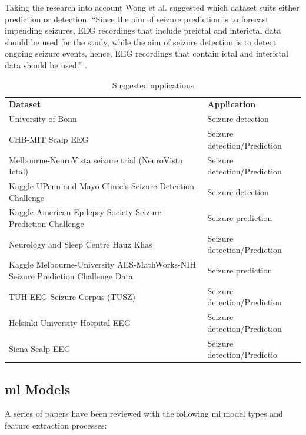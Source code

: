 \documentclass[12pt]{article}
\begin{document}
Taking the research into account Wong et al. suggested which dataset suits either prediction or detection. ``Since the aim of seizure prediction is to forecast impending seizures, EEG recordings that include preictal and interictal data should be used for the study, while the aim of seizure detection is to detect ongoing seizure events, hence, EEG recordings that contain ictal and interictal data should be used.'' \cite{wong2023eeg}.

\begin{table}[H]
\centering
\begin{tabular}{p{}p{}}
\textbf{Dataset}                     & \textbf{Application}         \\
University of Bonn                   & Seizure detection            \\
CHB-MIT Scalp EEG                    & Seizure detection/Prediction \\
Melbourne-NeuroVista seizure trial (NeuroVista Ictal)                           & Seizure detection/Prediction \\
Kaggle UPenn and Mayo Clinic's Seizure Detection Challenge                      & Seizure detection            \\
Kaggle American Epilepsy Society Seizure Prediction Challenge                   & Seizure prediction           \\
Neurology and Sleep Centre Hauz Khas & Seizure detection/Prediction \\
Kaggle Melbourne-University AES-MathWorks-NIH Seizure Prediction Challenge Data & Seizure prediction           \\
TUH EEG Seizure Corpus (TUSZ)        & Seizure detection/Prediction \\
Helsinki University Hospital EEG     & Seizure detection/Prediction \\
Siena Scalp EEG                      & Seizure detection/Predictio 
\end{tabular}
\caption{Suggested applications}
\label{dataset_applications}
\end{table} 

\subsection{\acrfull{ml} Models}\label{models}

A series of papers have been reviewed with the following \acrshort{ml} model types and feature extraction processes:
\end{document}
